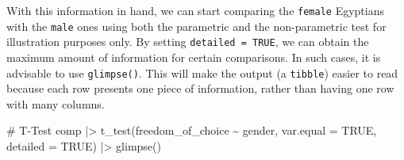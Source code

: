 \documentclass[
  letterpaper,
  DIV=11,
  numbers=noendperiod]{scrreprt}
\newenvironment{Shaded}{\begin{snugshade}}{\end{snugshade}}
\newcommand{\AttributeTok}[1]{\textcolor[rgb]{0.40,0.45,0.13}{#1}}
\newcommand{\CommentTok}[1]{\textcolor[rgb]{0.37,0.37,0.37}{#1}}
\newcommand{\ConstantTok}[1]{\textcolor[rgb]{0.56,0.35,0.01}{#1}}
\newcommand{\FunctionTok}[1]{\textcolor[rgb]{0.28,0.35,0.67}{#1}}
\newcommand{\NormalTok}[1]{\textcolor[rgb]{0.00,0.23,0.31}{#1}}
\newcommand{\SpecialCharTok}[1]{\textcolor[rgb]{0.37,0.37,0.37}{#1}}
\begin{document}
\begin{table}

\caption{\label{tbl-comparing-two-groups-unpaired}Comparing two unpaired
groups}


\end{table}%

With this information in hand, we can start comparing the
\texttt{female} Egyptians with the \texttt{male} ones using both the
parametric and the non-parametric test for illustration purposes only.
By setting \texttt{detailed\ =\ TRUE}, we can obtain the maximum amount
of information for certain comparisons. In such cases, it is advisable
to use \texttt{glimpse()}. This will make the output (a \texttt{tibble})
easier to read because each row presents one piece of information,
rather than having one row with many columns.

\begin{Shaded}
\begin{Highlighting}[]
\CommentTok{\# T{-}Test}
\NormalTok{comp }\SpecialCharTok{|\textgreater{}} \FunctionTok{t\_test}\NormalTok{(freedom\_of\_choice }\SpecialCharTok{\textasciitilde{}}\NormalTok{ gender,}
                \AttributeTok{var.equal =} \ConstantTok{TRUE}\NormalTok{,}
                \AttributeTok{detailed =} \ConstantTok{TRUE}\NormalTok{) }\SpecialCharTok{|\textgreater{}}
  \FunctionTok{glimpse}\NormalTok{()}
\end{Highlighting}
\end{Shaded}
\end{document}
